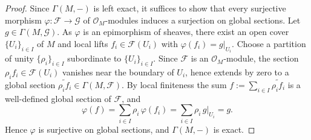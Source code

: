 \documentclass[11pt]{article}
\begin{document}
\begin{proof}
  Since $ \Gamma(M,-) $ is left exact, it suffices to show that every surjective morphism 
  $ \varphi : \mathscr{F} \to \mathscr{G} $ of $ \mathscr{O}_{M} $-modules induces a surjection on global sections. 
  Let $ g \in \Gamma(M,\mathscr{G}) $. As $ \varphi $ is an epimorphism of sheaves, there exist an open cover 
  $ \{U_{i}\}_{i \in I} $ of $ M $ and local lifts $ f_{i} \in \mathscr{F}(U_{i}) $ with 
  $ \varphi(f_{i}) = g|_{U_{i}} $. Choose a partition of unity $ \{\rho_{i}\}_{i \in I} $ subordinate to 
  $ \{U_{i}\}_{i \in I} $. Since $ \mathscr{F} $ is an $ \mathscr{O}_{M} $-module, the section 
  $ \rho_{i} f_{i} \in \mathscr{F}(U_{i}) $ vanishes near the boundary of $ U_{i} $, hence extends by zero 
  to a global section $ \widetilde{\rho_{i} f_{i}} \in \Gamma(M,\mathscr{F}) $. 
  By local finiteness the sum $ f := \sum_{i \in I} \widetilde{\rho_{i} f_{i}} $ is a well-defined global section of $ \mathscr{F} $, and
  $$ \varphi(f) = \sum_{i \in I} \rho_{i}\,\varphi(f_{i}) = \sum_{i \in I} \rho_{i}\, g|_{U_{i}} = g . $$
  Hence $ \varphi $ is surjective on global sections, and $ \Gamma(M,-) $ is exact.
\end{proof}
\end{document}
